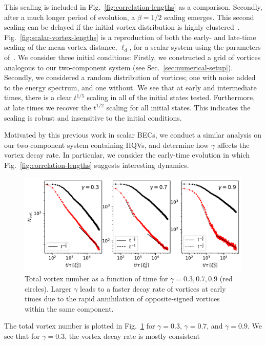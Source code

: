 This scaling is included in Fig.~\ref{fig:correlation-lengths} as a comparison.
Secondly, after a much longer period of evolution, a $\beta=1/2$ scaling
emerges.
This second scaling can be delayed if the initial vortex distribution is
highly clustered~\cite{Karl2017}.
Fig.~\ref{fig:scalar-vortex-lengths} is a reproduction of both the early- and
late-time scaling of the mean vortex distance, $\ell_d$, for a scalar system
using the parameters of~\cite{Karl2017}.
We consider three initial conditions: Firstly, we constructed a grid of vortices
analogous to our two-component system (see Sec.~\ref{sec:numerical-setup}).
Secondly, we considered a random distribution of vortices; one with noise
added to the energy spectrum, and one without.
We see that at early and intermediate times, there is a clear $t^{1/5}$ scaling
in all of the initial states tested.
Furthermore, at late times we recover the $t^{1/2}$ scaling for all initial
states.
This indicates the scaling is robust and insensitive to the initial conditions.
\par
Motivated by this previous work in scalar BECs, we conduct a similar analysis
on our two-component system containing HQVs, and determine how $\gamma$ affects
the vortex decay rate.
In particular, we consider the early-time evolution in which
Fig.~\ref{fig:correlation-lengths} suggests interesting dynamics.
\begin{figure}
    \centering
    \includegraphics[width=\textwidth]{gfx/ch-twoCompDynamics/vortex_number.pdf}
    \caption{Total vortex number as a function of time for $\gamma=0.3,0.7,0.9$
    (red circles). Larger $\gamma$ leads to a faster decay rate of vortices at
    early times due to the rapid annihilation of opposite-signed vortices
    within the same component.}
    \label{fig:vortex-number}
\end{figure}
The total vortex number is plotted in Fig.~\ref{fig:vortex-number} for
$\gamma=0.3$, $\gamma=0.7$, and $\gamma=0.9$.
We see that for $\gamma=0.3$, the vortex decay rate is mostly consistent
